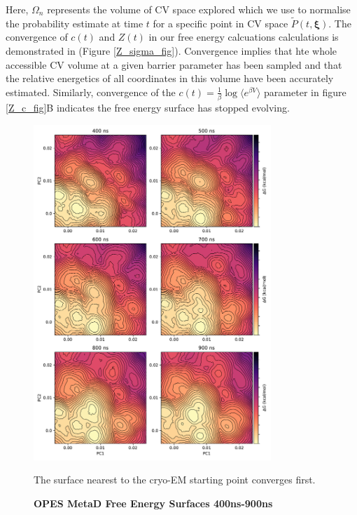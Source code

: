 Here, $\Omega_n$ represents the volume of CV space explored which we use to normalise the probability estimate at time $t$ for a specific point in CV space $\tilde{P}(t, \mathbf{\xi})$. The convergence of $c(t)$ and $Z(t)$ in our free energy calcuations calculations is demonstrated in (Figure \ref{Z_sigma_fig}). Convergence implies that hte whole accessible CV volume at a given barrier parameter has been sampled and that the relative energetics of all coordinates in this volume have been accurately estimated. Similarly, convergence of the $c(t) = \frac{1}{\beta} \log \langle e^{\beta V} \rangle$ parameter in figure \ref{Z_c_fig}B indicates the free energy surface has stopped evolving. 

\begin{figure}
	\begin{center}
		\includegraphics[width=0.8\textwidth]{figures/opening/convergence_1.pdf}
	\end{center}
	\captionsetup{singlelinecheck = false, justification=raggedright}
	\caption[OPES MetaD Free Energy Surfaces 400ns-900ns] {\textbf{OPES MetaD Free Energy Surfaces 400ns-900ns}}{The surface nearest to the cryo-EM starting point converges first.} 
	\label{convergence_opes_1}
\end{figure}

